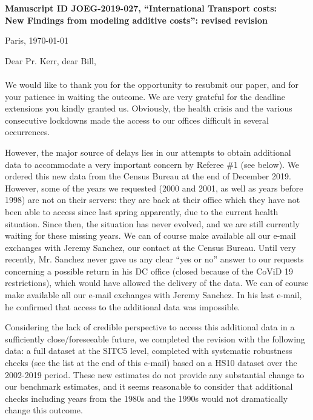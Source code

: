 \documentclass[12pt]{article}
\begin{document}
\noindent \textbf{Manuscript ID JOEG-2019-027, ``International Transport costs:\\New Findings from modeling additive costs'': revised revision}

\bigskip
\bigskip

\hfill Paris, \today

\bigskip
\noindent Dear Pr. Kerr, dear Bill, \\
\\
\noindent \noindent We would like to thank you for the opportunity to resubmit our paper, and for your patience in waiting the outcome. We are very grateful for the deadline extensions you kindly granted us. Obviously, the health crisis and the various consecutive lockdowns made the access to our offices difficult in several occurrences.

However, the major source of delays lies in our attempts to obtain additional data to accommodate a very important concern by Referee \#1 (see below). We ordered this new data from the Census Bureau at the end of December 2019. However, some of the years we requested (2000 and 2001, as well as years before 1998) are not on their servers: they are back at their office which they have not been able to access since last spring apparently, due to the current health situation. Since then, the situation has never evolved, and we are still currently waiting for these missing years. We can of course make available all our e-mail exchanges with Jeremy Sanchez, our contact at the Census Bureau. Until very recently, Mr. Sanchez never gave us any clear “yes or no” answer to our requests concerning a possible return in his DC office (closed because of the CoViD 19 restrictions), which would have allowed the delivery of the data. We can of course make available all our e-mail exchanges with Jeremy Sanchez. In his last e-mail, he confirmed that access to the additional data was impossible.

Considering the lack of credible perspective to access this additional data in a sufficiently close/foreseeable future, we completed the revision with the following data: a full dataset at the SITC5 level, completed with systematic robustness checks (see the list at the end of this e-mail) based on a HS10 dataset over the 2002-2019 period. These new estimates do not provide any substantial change to our benchmark estimates, and it seems reasonable to consider that additional checks including years from the 1980s and the 1990s would not dramatically change this outcome.
\end{document}
